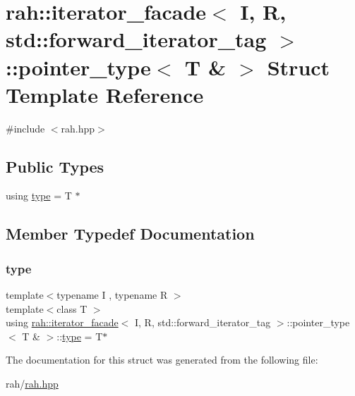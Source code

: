 \hypertarget{structrah_1_1iterator__facade_3_01_i_00_01_r_00_01std_1_1forward__iterator__tag_01_4_1_1pointer__type_3_01_t_01_6_01_4}{}\section{rah\+::iterator\+\_\+facade$<$ I, R, std\+::forward\+\_\+iterator\+\_\+tag $>$\+::pointer\+\_\+type$<$ T \& $>$ Struct Template Reference}
\label{structrah_1_1iterator__facade_3_01_i_00_01_r_00_01std_1_1forward__iterator__tag_01_4_1_1pointer__type_3_01_t_01_6_01_4}


{\ttfamily \#include $<$rah.\+hpp$>$}

\subsection*{Public Types}
\begin{DoxyCompactItemize}
\item 
using \mbox{\hyperlink{structrah_1_1iterator__facade_3_01_i_00_01_r_00_01std_1_1forward__iterator__tag_01_4_1_1pointer__type_3_01_t_01_6_01_4_ae2819aa7fbf4febbc6f3cb0034745653}{type}} = T $\ast$
\end{DoxyCompactItemize}


\subsection{Member Typedef Documentation}
\mbox{\label{structrah_1_1iterator__facade_3_01_i_00_01_r_00_01std_1_1forward__iterator__tag_01_4_1_1pointer__type_3_01_t_01_6_01_4_ae2819aa7fbf4febbc6f3cb0034745653}} 
\subsubsection{\texorpdfstring{type}{type}}
{\footnotesize\ttfamily template$<$typename I , typename R $>$ \\
template$<$class T $>$ \\
using \mbox{\hyperlink{structrah_1_1iterator__facade}{rah\+::iterator\+\_\+facade}}$<$ I, R, std\+::forward\+\_\+iterator\+\_\+tag $>$\+::pointer\+\_\+type$<$ T \& $>$\+::\mbox{\hyperlink{structrah_1_1iterator__facade_3_01_i_00_01_r_00_01std_1_1forward__iterator__tag_01_4_1_1pointer__type_3_01_t_01_6_01_4_ae2819aa7fbf4febbc6f3cb0034745653}{type}} =  T$\ast$}



The documentation for this struct was generated from the following file\+:\begin{DoxyCompactItemize}
\item 
rah/\mbox{\hyperlink{rah_8hpp}{rah.\+hpp}}\end{DoxyCompactItemize}
